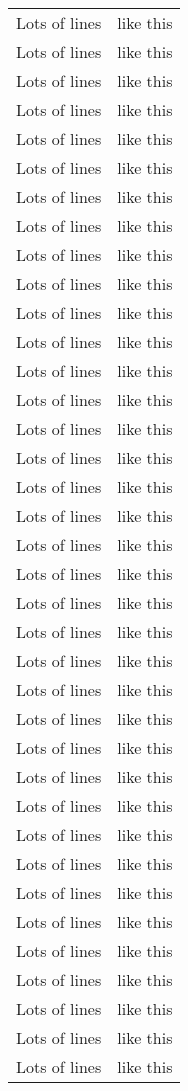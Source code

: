 \documentclass[a4paper, 12pt]{article}
\begin{document}
\begin{longtable}[c]{| c | c |}
    Lots of lines & like this\\
    Lots of lines & like this\\
    Lots of lines & like this\\
    Lots of lines & like this\\
    Lots of lines & like this\\
    Lots of lines & like this\\
    Lots of lines & like this\\
    Lots of lines & like this\\
    Lots of lines & like this\\
    Lots of lines & like this\\
    Lots of lines & like this\\
    Lots of lines & like this\\
    Lots of lines & like this\\
    Lots of lines & like this\\
    Lots of lines & like this\\
    Lots of lines & like this\\
    Lots of lines & like this\\
    Lots of lines & like this\\
    Lots of lines & like this\\
    Lots of lines & like this\\
    Lots of lines & like this\\
    Lots of lines & like this\\
    Lots of lines & like this\\
    Lots of lines & like this\\
    Lots of lines & like this\\
    Lots of lines & like this\\
    Lots of lines & like this\\
    Lots of lines & like this\\
    Lots of lines & like this\\
    Lots of lines & like this\\
    Lots of lines & like this\\
    Lots of lines & like this\\
    Lots of lines & like this\\
    Lots of lines & like this\\
    Lots of lines & like this\\
    Lots of lines & like this\\
    Lots of lines & like this\\

\end{longtable}
\end{document}
